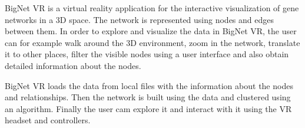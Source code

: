 %
%



BigNet VR is a virtual reality application for the interactive visualization of gene networks in a 3D space. The network is represented using nodes and edges between them. In order to explore and visualize the data in BigNet VR, the user can for example walk around the 3D environment, zoom in the network, translate it to other places, filter the visible nodes using a user interface and also obtain detailed information about the nodes.

BigNet VR loads the data from local files with the information about the nodes and relationships. Then the network is built using the data and clustered using an algorithm. Finally the user cam explore it and interact with it using the VR headset and controllers.

